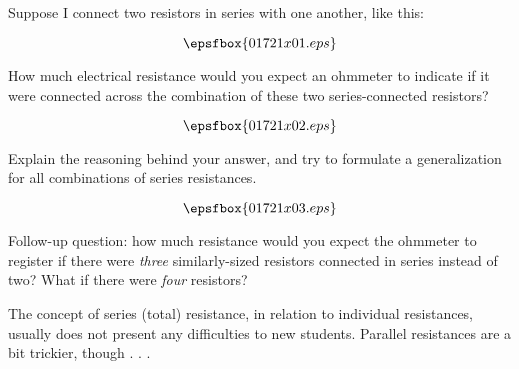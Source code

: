 

Suppose I connect two resistors in series with one another, like this:

$$\epsfbox{01721x01.eps}$$

How much electrical resistance would you expect an ohmmeter to indicate if it were connected across the combination of these two series-connected resistors?

$$\epsfbox{01721x02.eps}$$

Explain the reasoning behind your answer, and try to formulate a generalization for all combinations of series resistances.







$$\epsfbox{01721x03.eps}$$

Follow-up question: how much resistance would you expect the ohmmeter to register if there were {\it three} similarly-sized resistors connected in series instead of two?  What if there were {\it four} resistors?







The concept of series (total) resistance, in relation to individual resistances, usually does not present any difficulties to new students.  Parallel resistances are a bit trickier, though . . .




